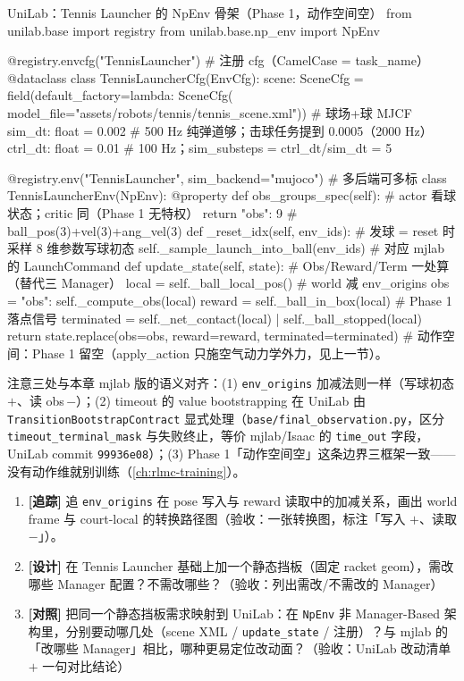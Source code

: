 \begin{codebox}[Python]{UniLab：Tennis Launcher 的 NpEnv 骨架（Phase 1，动作空间空）}
from unilab.base import registry
from unilab.base.np_env import NpEnv

@registry.envcfg("TennisLauncher")                 # 注册 cfg（CamelCase = task_name）
@dataclass
class TennisLauncherCfg(EnvCfg):
    scene: SceneCfg = field(default_factory=lambda: SceneCfg(
        model_file="assets/robots/tennis/tennis_scene.xml"))   # 球场+球 MJCF
    sim_dt: float = 0.002       # 500 Hz 纯弹道够；击球任务提到 0.0005（2000 Hz）
    ctrl_dt: float = 0.01       # 100 Hz；sim_substeps = ctrl_dt/sim_dt = 5

@registry.env("TennisLauncher", sim_backend="mujoco")          # 多后端可多标
class TennisLauncherEnv(NpEnv):
    @property
    def obs_groups_spec(self):                     # actor 看球状态；critic 同（Phase 1 无特权）
        return {"obs": 9}                          # ball_pos(3)+vel(3)+ang_vel(3)
    def _reset_idx(self, env_ids):                 # 发球 = reset 时采样 8 维参数写球初态
        self._sample_launch_into_ball(env_ids)     # 对应 mjlab 的 LaunchCommand
    def update_state(self, state):                 # Obs/Reward/Term 一处算（替代三 Manager）
        local = self._ball_local_pos()             # world 减 env_origins
        obs = {"obs": self._compute_obs(local)}
        reward = self._ball_in_box(local)          # Phase 1 落点信号
        terminated = self._net_contact(local) | self._ball_stopped(local)
        return state.replace(obs=obs, reward=reward, terminated=terminated)
    # 动作空间：Phase 1 留空（apply_action 只施空气动力学外力，见上一节）。
\end{codebox}

注意三处与本章 mjlab 版的语义对齐：(1) \verb|env_origins| 加减法则一样（写球初态\,$+$、读 obs\,$-$）；(2) timeout 的 value bootstrapping 在 UniLab 由 \verb|TransitionBootstrapContract| 显式处理（\verb|base/final_observation.py|，区分 \verb|timeout_terminal_mask| 与失败终止，等价 mjlab/Isaac 的 \verb|time_out| 字段，UniLab commit \texttt{99936e08}）；(3) Phase 1「动作空间空」这条边界三框架一致——没有动作维就别训练（\cref{ch:rlmc-training}）。

\begin{practice}[本节动手任务]
\begin{enumerate}
  \item \textbf{[追踪]} 追 \verb|env_origins| 在 pose 写入与 reward 读取中的加减关系，画出 world frame 与 court-local 的转换路径图（验收：一张转换图，标注「写入 $+$、读取 $-$」）。
  \item \textbf{[设计]} 在 Tennis Launcher 基础上加一个静态挡板（固定 racket geom），需改哪些 Manager 配置？不需改哪些？（验收：列出需改/不需改的 Manager）
  \item \textbf{[对照]} 把同一个静态挡板需求映射到 UniLab：在 \verb|NpEnv| 非 Manager-Based 架构里，分别要动哪几处（scene XML / \verb|update_state| / 注册）？与 mjlab 的「改哪些 Manager」相比，哪种更易定位改动面？（验收：UniLab 改动清单 $+$ 一句对比结论）
\end{enumerate}
\end{practice}


